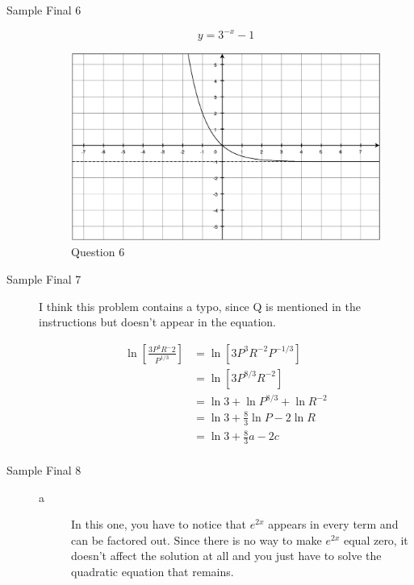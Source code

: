 \documentclass[fleqn,addpoints]{exam}
\begin{document}
\begin{description}

\item[Sample Final 6]
\[
 y = 3^{-x} - 1
\]


\begin{figure}[H]
  \centering
  \includegraphics[scale=.5]{final_6.eps}
  \caption*{Question 6}
\end{figure}

\item[Sample Final 7]

I think this problem contains a typo, since Q is mentioned in the instructions but doesn't appear in the equation.

\begin{align*}
  \ln \left[ \frac{3 P^3 R^-2}{P^{1/3}} \right] &= \ln [ 3P^3 R^{-2} P^{-1/3} ] \\
  &= \ln [ 3P^{8/3} R^{-2} ] \\
  &= \ln 3 + \ln P^{8/3} + \ln R^{-2}  \\
  &= \ln 3 + \frac{8}{3} \ln P - 2 \ln R  \\
  &= \ln 3 + \frac{8}{3} a - 2 c  \\
\end{align*}

\item[Sample Final 8]
\begin{description}
\item[a]
In this one, you have to notice that $e^{2x}$ appears in every term and can be factored out.  Since there is no way to
make $e^{2x}$ equal zero, it doesn't affect the solution at all and you just have to solve the quadratic equation that
remains.


\end{description}
\end{description}
\end{document}
